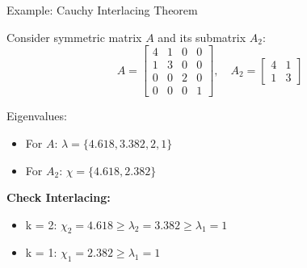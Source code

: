 \documentclass[aspectratio=169]{beamer}
\begin{document}
\begin{frame}{Example: Cauchy Interlacing Theorem}

Consider symmetric matrix \( A \) and its submatrix \( A_2 \):
\[
A = \begin{bmatrix}
4 & 1 & 0 & 0 \\
1 & 3 & 0 & 0 \\
0 & 0 & 2 & 0 \\
0 & 0 & 0 & 1 
\end{bmatrix}, \quad
A_2 = \begin{bmatrix}
4 & 1 \\
1 & 3
\end{bmatrix}
\]

Eigenvalues:
\begin{itemize}
    \item For \( A \): \( \lambda = \{4.618, 3.382, 2, 1\} \)
    \item For \( A_2 \): \( \chi = \{4.618, 2.382\} \)
\end{itemize}

\textbf{Check Interlacing:}
\begin{itemize}
    \item k = 2: \(\chi_2 = 4.618  \geq  \lambda_2 = 3.382 \geq  \lambda_1 = 1 \)
    \item k = 1:  \(\chi_1 = 2.382  \geq  \lambda_1 = 1 \)
\end{itemize}
\end{frame}
\end{document}
